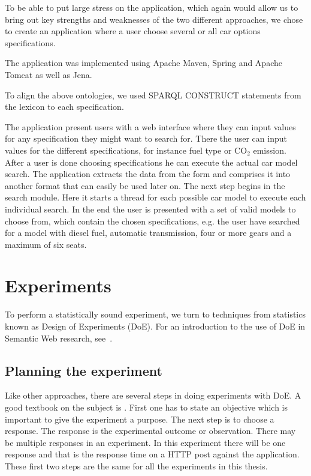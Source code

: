\documentclass{llncs}
\begin{document}
To be able to put large stress on the application, which again would
allow us to bring out key strengths and weaknesses of the two
different approaches, we chose to create an application where a user
choose several or all car options specifications.

The application was implemented using Apache Maven, Spring and Apache
Tomcat as well as Jena.

To align the above ontologies, we used SPARQL CONSTRUCT statements
from the lexicon to each specification.

The application present users with a web interface where they can
input values for any specification they might want to search
for. There the user can input values for the different specifications,
for instance fuel type or CO$_2$ emission. After a user is done
choosing specifications he can execute the actual car model
search. The application extracts the data from the form and comprises
it into another format that can easily be used later on. The next step
begins in the search module. Here it starts a thread for each possible
car model to execute each individual search. In the end the user is
presented with a set of valid models to choose from, which contain the
chosen specifications, e.g. the user have searched for a model with
diesel fuel, automatic transmission, four or more gears and a maximum
of six seats.


\section{Experiments}\label{Results}

To perform a statistically sound experiment, we turn to techniques
from statistics known as Design of Experiments (DoE). For an
introduction to the use of DoE in Semantic Web research, see~\cite{Kjern}.

\subsection{Planning the experiment}
Like other approaches, there are several steps in doing experiments
with DoE. A good textbook on the subject is \cite{PlanExp}. First one
has to state an objective which is important to give the experiment a
purpose.  The next step is to choose a response. The response is the
experimental outcome or observation. There may be multiple responses
in an experiment. In this experiment there will be one response and
that is the response time on a HTTP post against the application.
These first two steps are the same for all the experiments in this
thesis.
\end{document}
